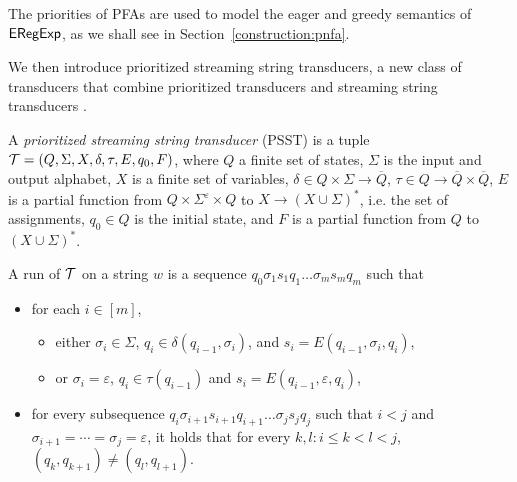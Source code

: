 The priorities of PFAs are used to model the eager and greedy semantics of ${\sf ERegExp}$, as we shall see in Section~\ref{construction:pnfa}.



We then introduce prioritized streaming string transducers, a new class of transducers that combine prioritized transducers \cite{BM17} %
and streaming string transducers \cite{AC10,AD11}.
  
\begin{definition}
A \emph{prioritized streaming string transducer} (PSST) is a tuple $\mathcal{T} = (Q, \Sigma, X, \delta, \tau, E, q_0, F)$, where $Q$ a
finite set of states, $\Sigma$ is the input and output alphabet, $X$ is a finite set of variables, $\delta \in Q \times \Sigma \rightarrow \overline{Q}$, $\tau \in Q \rightarrow \overline{Q} \times \overline{Q}$, $E$ is a partial function from $Q \times \Sigma^\varepsilon \times
  Q$ to $X \rightarrow (X \cup \Sigma)^{\ast}$, i.e. the set of assignments,
   $q_0 \in Q$ is the initial state, and $F$ is a partial function
  from $Q$ to $(X \cup \Sigma)^{\ast}$.

A run of $\mathcal{T}$ on a string $w$ is a sequence $q_0 \sigma_1 s_1 q_1 \ldots \sigma_m s_m q_m$ such that
\begin{itemize}
%
\item for each $i \in [m]$, 
\begin{itemize}
\item either $\sigma_i \in \Sigma$, $q_i \in \delta (q_{i-1}, \sigma_i)$, and $s_i = E (q_{i - 1}, \sigma_i, q_i)$, 
\item or $\sigma_i = \varepsilon$, $q_i \in \tau(q_{i-1})$ and $s_i = E (q_{i - 1}, \varepsilon, q_i)$,
\end{itemize}

\item for every subsequence $q_i \sigma_{i+1} s_{i+1} q_{i+1} \ldots \sigma_{j} s_j q_j$ such that  $i < j$ and $\sigma_{i+1} = \cdots = \sigma_j = \varepsilon$,  it holds that for every $k, l: i \le k < l < j$, $(q_k, q_{k+1}) \neq (q_l, q_{l+1})$.
\end{itemize}


\end{definition}
